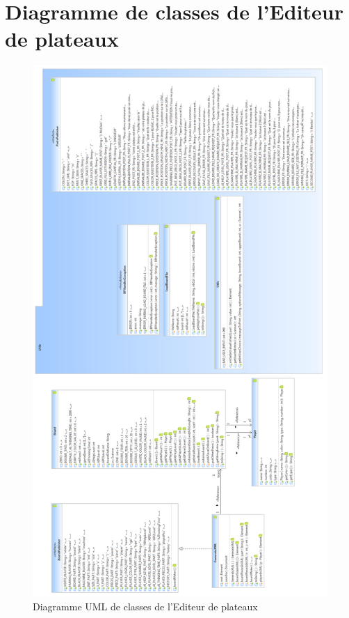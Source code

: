 \documentclass[a4paper,12pt]{report}
\begin{document}
\section{Diagramme de classes de l'Editeur de plateaux}
\label{clsBP}
\begin{figure}[H]
\centering
  \includegraphics[scale=0.34]{Architecture/BoardPublisher.png}
\caption{Diagramme UML de classes de l'Editeur de plateaux}
\end{figure}
\end{document}
